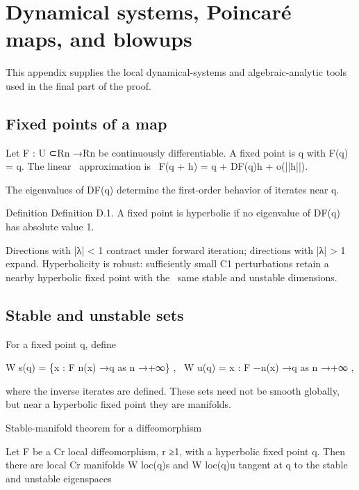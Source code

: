 \chapter{Dynamical systems, Poincaré maps, and blowups}
This appendix supplies the local dynamical-systems and algebraic-analytic tools used in the final part of the proof.


\section{Fixed points of a map}

\begin{displaytext}
Let F : U ⊂Rn →Rn be continuously differentiable. A fixed point is q with F(q) = q. The linear \
approximation is \
F(q + h) = q + DF(q)h + o(||h||).
\end{displaytext}

The eigenvalues of DF(q) determine the first-order behavior of iterates near q.


\begin{statementbox}{Definition}
Definition D.1. A fixed point is hyperbolic if no eigenvalue of DF(q) has absolute value 1.
\end{statementbox}

\begin{displaytext}
Directions with |λ| < 1 contract under forward iteration; directions with |λ| > 1 expand. Hyperbolicity is robust: sufficiently small C1 perturbations retain a nearby hyperbolic fixed point with the \
same stable and unstable dimensions.
\end{displaytext}

\section{Stable and unstable sets}

For a fixed point q, define


\begin{displaytext}
W s(q) = \{x : F n(x) →q as n →+∞\} , \
W u(q) = x : F −n(x) →q as n →+∞ ,
\end{displaytext}

where the inverse iterates are defined. These sets need not be smooth globally, but near a hyperbolic fixed point they are manifolds.


Stable-manifold theorem for a diffeomorphism


Let F be a Cr local diffeomorphism, r ≥1, with a hyperbolic fixed point q. Then there are local Cr manifolds W loc(q)s and W loc(q)u tangent at q to the stable and unstable eigenspaces



